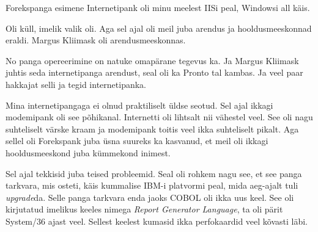 
Forekspanga esimene Internetipank oli minu meelest 
IISi peal, 
Windowsi all käis. 


Oli küll, imelik valik oli. Aga sel ajal oli meil juba arendus ja 
hooldusmeeskonnad eraldi. Margus Kliimask oli 
arendusmeeskonnas. 


No panga opereerimine on natuke omapärane tegevus ka. Ja Margus 
Kliimask juhtis seda internetipanga arendust, seal 
oli ka Pronto tal kambas. Ja  veel paar 
hakkajat selli ja tegid internetipanka. 


Mina internetipangaga ei olnud praktiliselt üldse seotud. Sel ajal ikkagi 
modemipank oli see põhikanal. Internetti oli lihtsalt nii vähestel veel. See 
oli nagu suhteliselt värske kraam ja modemipank toitis veel ikka suhteliselt 
pikalt. Aga sellel oli Forekspank juba üsna suureks ka kasvanud, et meil oli 
ikkagi hooldusmeeskond juba kümmekond inimest.


Sel ajal tekkisid juba teised probleemid. Seal oli rohkem nagu see, et see 
panga tarkvara, mis osteti, käis kummalise IBM-i platvormi peal, mida aeg-ajalt 
tuli \emph{upgrade}da. Selle panga tarkvara enda jaoks COBOL oli ikka uus keel. 
See oli kirjutatud imelikus keeles nimega \emph{Report Generator Language}, ta 
oli pärit System/36 ajast veel. Sellest keelest 
kumasid ikka perfokaardid veel kõvasti läbi.

